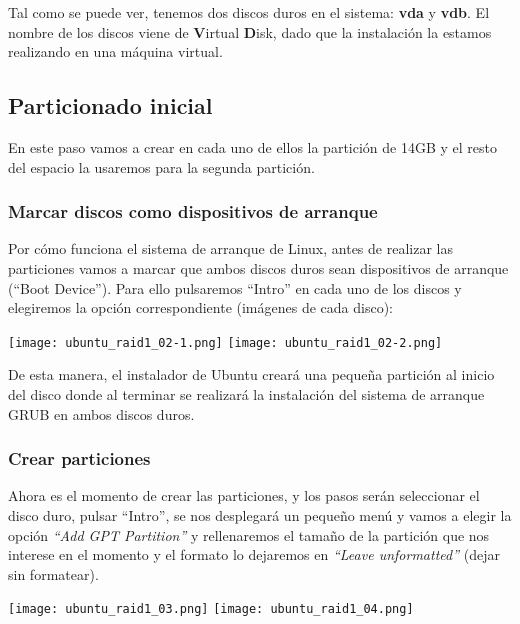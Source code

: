 Tal como se puede ver, tenemos dos discos duros en el sistema: \textbf{vda} y \textbf{vdb}. El nombre de los discos viene de \textbf{V}irtual \textbf{D}isk, dado que la instalación la estamos realizando en una máquina virtual.

\subsection{Particionado inicial}
En este paso vamos a crear en cada uno de ellos la partición de 14GB y  el resto del espacio la usaremos para la segunda partición.

\subsubsection{Marcar discos como dispositivos de arranque}
Por cómo funciona el sistema de arranque de Linux, antes de realizar las particiones vamos a marcar que ambos discos duros sean dispositivos de arranque (“Boot Device”). Para ello pulsaremos “Intro” en cada uno de los discos y elegiremos la opción correspondiente (imágenes de cada disco):

\begin{center}
    \texttt{[image: ubuntu\_raid1\_02-1.png]}
    \hspace{3cm}
    \texttt{[image: ubuntu\_raid1\_02-2.png]}
\end{center}

De esta manera, el instalador de Ubuntu creará una pequeña partición al inicio del disco donde al terminar se realizará la instalación del sistema de arranque GRUB en ambos discos duros.


\subsubsection{Crear particiones}
Ahora es el momento de crear las particiones, y los pasos serán seleccionar el disco duro, pulsar “Intro”, se nos desplegará un pequeño menú y vamos a elegir la opción  \textit{“Add GPT Partition”} y rellenaremos el tamaño de la partición que nos interese en el momento y el formato lo dejaremos en \textit{“Leave unformatted”} (dejar sin formatear).

\begin{center}
    \texttt{[image: ubuntu\_raid1\_03.png]}
    \hfill
    \texttt{[image: ubuntu\_raid1\_04.png]}
\end{center}



